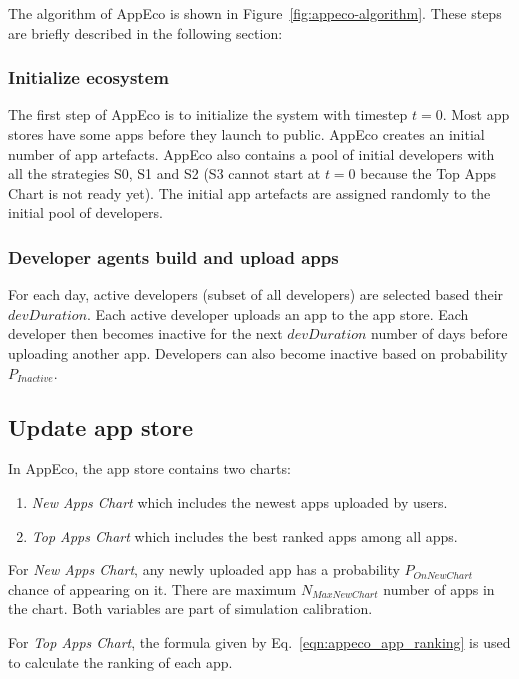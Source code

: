 The algorithm of AppEco is shown in Figure~\ref{fig:appeco-algorithm}. These steps are briefly described in the following section:

\subsubsection*{Initialize ecosystem}

The first step of AppEco is to initialize the system with timestep $t=0$. Most app stores have some apps before they launch to public. AppEco creates an initial number of app artefacts. AppEco also contains a pool of initial developers with all the strategies S0, S1 and S2 (S3 cannot start at $t=0$ because the Top Apps Chart is not ready yet). The initial app artefacts are assigned randomly to the initial pool of developers.

\subsubsection*{Developer agents build and upload apps}

For each day, active developers (subset of all developers) are selected based their $devDuration$. Each active developer uploads an app to the app store. Each developer then becomes inactive for the next $devDuration$ number of days before uploading another app. Developers can also become inactive based on probability $P_{Inactive}$.

\subsection*{Update app store}

In AppEco, the app store contains two charts:

\begin{enumerate}
  \item \emph{New Apps Chart} which includes the newest apps uploaded by users.
  \item \emph{Top Apps Chart} which includes the best ranked apps among all apps.
\end{enumerate}

For \emph{New Apps Chart}, any newly uploaded app has a probability $P_{OnNewChart}$ chance of appearing on it. There are maximum $N_{MaxNewChart}$ number of apps in the chart. Both variables are part of simulation calibration.

For \emph{Top Apps Chart}, the formula given by Eq.~\ref{eqn:appeco_app_ranking} is used to calculate the ranking of each app.


